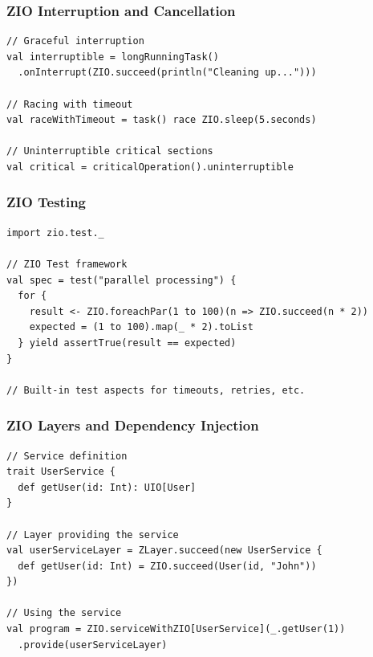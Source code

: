 \documentclass{beamer}
\begin{document}
\begin{frame}[fragile]
\frametitle{ZIO Interruption and Cancellation}

\begin{lstlisting}[style=scalaStyle]
// Graceful interruption
val interruptible = longRunningTask()
  .onInterrupt(ZIO.succeed(println("Cleaning up...")))

// Racing with timeout
val raceWithTimeout = task() race ZIO.sleep(5.seconds)

// Uninterruptible critical sections
val critical = criticalOperation().uninterruptible
\end{lstlisting}

\end{frame}

\begin{frame}[fragile]
\frametitle{ZIO Testing}

\begin{lstlisting}[style=scalaStyle]
import zio.test._

// ZIO Test framework
val spec = test("parallel processing") {
  for {
    result <- ZIO.foreachPar(1 to 100)(n => ZIO.succeed(n * 2))
    expected = (1 to 100).map(_ * 2).toList
  } yield assertTrue(result == expected)
}

// Built-in test aspects for timeouts, retries, etc.
\end{lstlisting}

\end{frame}

\begin{frame}[fragile]
\frametitle{ZIO Layers and Dependency Injection}

\begin{lstlisting}[style=scalaStyle]
// Service definition
trait UserService {
  def getUser(id: Int): UIO[User]
}

// Layer providing the service
val userServiceLayer = ZLayer.succeed(new UserService {
  def getUser(id: Int) = ZIO.succeed(User(id, "John"))
})

// Using the service
val program = ZIO.serviceWithZIO[UserService](_.getUser(1))
  .provide(userServiceLayer)
\end{lstlisting}

\end{frame}
\end{document}
